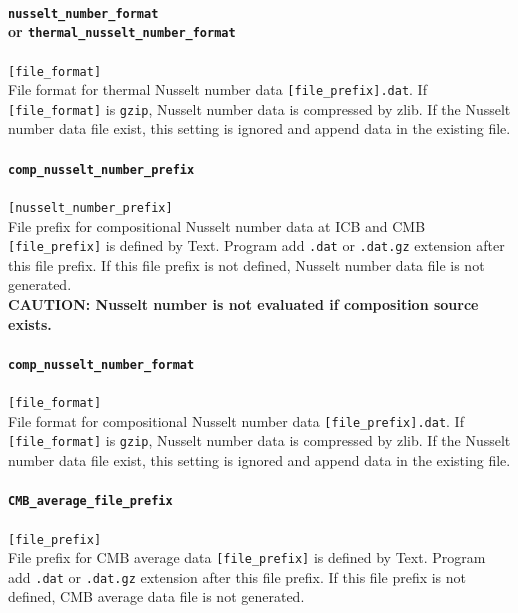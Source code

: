 \paragraph{{\tt nusselt\_number\_format} \\ 
or {\tt thermal\_nusselt\_number\_format}}
\label{href_t:nusselt_number_format}
\verb|[file_format]| \\
File format for thermal Nusselt number data \verb|[file_prefix].dat|. If \verb|[file_format]| is \verb|gzip|, Nusselt number data is compressed by zlib.  If the Nusselt number data file exist, this setting is ignored and append data in the existing file.

\paragraph{\tt comp\_nusselt\_number\_prefix}
\label{href_t:comp_nusselt_number_prefix}
\verb|[nusselt_number_prefix]| \\
File prefix for compositional Nusselt number data at ICB and CMB \verb|[file_prefix]| is defined by Text. Program add {\tt .dat} or {\tt .dat.gz} extension after this file prefix. If this file prefix is not defined, Nusselt number data file is not generated. \\
{\bf CAUTION: Nusselt number is not evaluated if composition source exists.}

\paragraph{\tt comp\_nusselt\_number\_format}
\label{href_t:comp_nusselt_number_format}
\verb|[file_format]| \\
File format for compositional Nusselt number data \verb|[file_prefix].dat|. If \verb|[file_format]| is \verb|gzip|, Nusselt number data is compressed by zlib.  If the Nusselt number data file exist, this setting is ignored and append data in the existing file.

\paragraph{\tt CMB\_average\_file\_prefix}
\label{href_t:CMB_average_file_prefix}
\verb|[file_prefix]| \\
File prefix for CMB average data \verb|[file_prefix]| is defined by Text. Program add {\tt .dat} or {\tt .dat.gz} extension after this file prefix. If this file prefix is not defined, CMB average data file is not generated. \\

